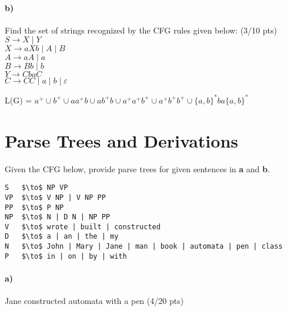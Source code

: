\documentclass[a4paper,12pt]{article}
\begin{document}
\paragraph{b)} Find the set of strings recognized by the CFG rules given below:         \hfill \small{(3/10 pts)} \\


$S \to X \mid Y$ \\
$X \to aXb \mid A \mid B$ \\
$A \to aA \mid a$ \\
$B \to Bb \mid b$ \\
$Y \to CbaC$ \\
$C \to CC \mid a \mid b \mid \varepsilon$  \\

\begin{tcolorbox}
L(G) = $a^+ \cup b^+ \cup aa^+b \cup ab^+b \cup a^+a^+b^+ \cup a^+b^+b^+ \cup \{a,b\}^*ba\{a,b\}^* $
\end{tcolorbox}


\newpage
\section{Parse Trees and Derivations \hfill {}}
Given the CFG below, provide parse trees for given sentences in \textbf{a} and \textbf{b}.\\

\begin{lstlisting}[style=output,mathescape=true]
S   $\to$ NP VP
VP  $\to$ V NP | V NP PP
PP  $\to$ P NP
NP  $\to$ N | D N | NP PP
V   $\to$ wrote | built | constructed
D   $\to$ a | an | the | my
N   $\to$ John | Mary | Jane | man | book | automata | pen | class
P   $\to$ in | on | by | with
\end{lstlisting}

\paragraph{a)} Jane constructed automata with a pen \hfill \small{(4/20 pts)} \\

\begin{tcolorbox}
\\ \\

\end{tcolorbox}
\end{document}
